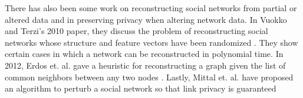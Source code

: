 \indent There has also been some work on reconstructing social networks from partial or altered data and in preserving privacy when altering network data. In Vuokko and Terzi's 2010 paper, they discuss the problem of reconstructing social networks whose structure and feature vectors have been randomized \cite{Vuokko10}. They show certain cases in which a network can be reconstructed in polynomial time. In 2012, Erdos et. al. gave a heuristic for reconstructing a graph given the list of common neighbors between any two nodes \cite{Erdos12}. Lastly, Mittal et. al. have proposed an algorithm to perturb a social network so that link privacy is guaranteed \cite{Mittal13}